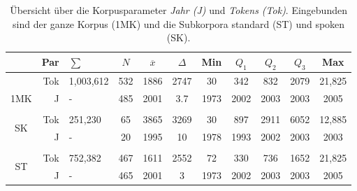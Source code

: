 \documentclass[12pt,headsepline,a4paper]{scrartcl}
\begin{document}
\begin{table}
\caption{Übersicht über die Korpusparameter \textit{Jahr (J)} und \textit{Tokens (Tok)}. Eingebunden sind der ganze Korpus (1MK) und die Subkorpora standard (ST) und spoken (SK).}
\label{tab: par_tot_describe}
\small
	\begin{tabularx}{\textwidth}{crXccc|ccccc}
	\toprule
	&Par & $\sum$ & $N$ &$\overline{x}$ & $\Delta$ & Min & $Q_1$ & $Q_2$ & $Q_3$ & Max\\
	\midrule
	&Tok & 1,003,612 & 532 &1886 & 2747 & 30 & 342 & 832 & 2079 & 21,825\\
	\multirow{-2}{*}{\footnotesize{1MK}}&J & - & 485&2001  & 3.7 & 1973 & 2002 & 2003 & 2003 & 2005\\
\\
\multirow{2}{*}{SK}&Tok & 251,230 & 65 & 3865 & 3269 & 30 & 897 & 2911 & 6052 & 12,885 \\ 
&J& -& 20 & 1995 & 10 & 1978 & 1993 & 2002 & 2003 & 2003 \\
\\
\multirow{2}{*}{ST}&Tok& 752,382 & 467 & 1611 & 2552 & 72 & 330 & 736 & 1652 & 21,825 \\
&J& - & 465 & 2001 & 3 & 1973 & 2002 & 2003 & 2003 & 2005 \\ 
	\bottomrule
	\end{tabularx}
	
\end{table}


% 
% 
% 
\end{document}
